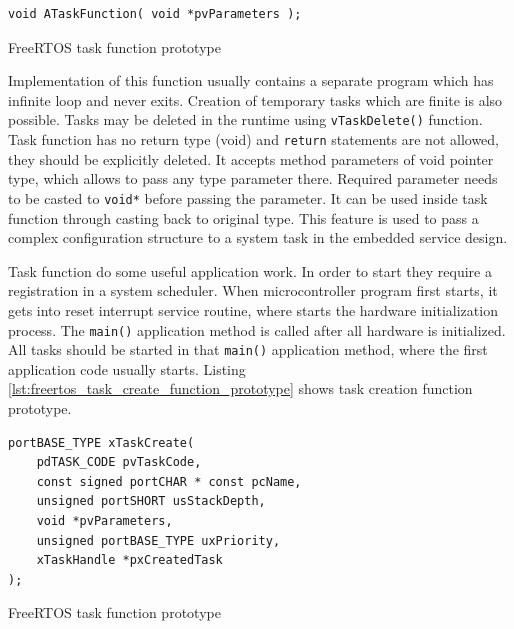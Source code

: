 \begin{listing}[H]
\begin{verbatim}
void ATaskFunction( void *pvParameters );
\end{verbatim}
\caption{FreeRTOS task function prototype}
\label{lst:freertos_task_function_prototype}
\end{listing} 

Implementation of this function usually contains a separate program which has  infinite loop and never exits.  
Creation of temporary tasks which are finite is also possible.
Tasks may be deleted in the runtime using \texttt{vTaskDelete()} function.
Task function has no return type (void) and \texttt{return} statements are not allowed, they should be explicitly deleted.
It accepts method parameters of void pointer type, which allows to pass any type parameter there.
Required parameter needs to be casted to \texttt{void*} before passing the parameter.
It can be used inside task function through casting back to original type. 
This feature is used to pass a complex configuration structure to a system task in the embedded service design.

Task function do some useful application work. In order to start they require a registration in a system scheduler.
When microcontroller program first starts, it gets into reset interrupt service routine, where starts the hardware initialization process.
The \texttt{main()} application method is called after all hardware is initialized.
All tasks should be started in that \texttt{main()} application method, where the first application code usually starts.
Listing \autoref{lst:freertos_task_create_function_prototype} shows task
creation function prototype.
\begin{listing}[H]
\begin{verbatim}
portBASE_TYPE xTaskCreate( 
	pdTASK_CODE pvTaskCode, 
	const signed portCHAR * const pcName, 
	unsigned portSHORT usStackDepth, 
	void *pvParameters, 
	unsigned portBASE_TYPE uxPriority, 
	xTaskHandle *pxCreatedTask 
);
\end{verbatim}
\caption{FreeRTOS task function prototype}
\label{lst:freertos_task_create_function_prototype}
\end{listing} 

